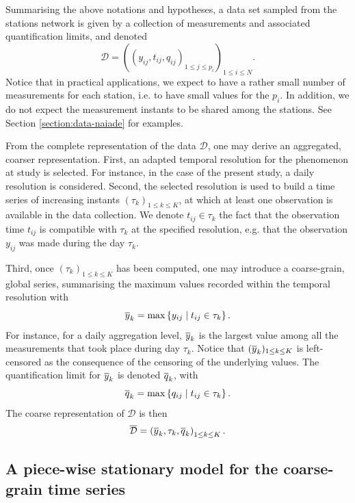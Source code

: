 Summarising the above notations and hypotheses, a data set sampled from the stations network is given by a collection of measurements and associated quantification limits, and denoted
\begin{equation*}
 \mathcal{D}=\left(\left(y_{ij},t_{ij}, q_{ij}\right)_{1\leq j\leq p_i}\right)_{1\leq i\leq N}.   
\end{equation*}
Notice that in practical applications, we expect to have a rather small number of measurements for each station, i.e. to have small values for the $p_i$. In addition, we do not expect the measurement instants to be shared among the stations. See Section \ref{section:data-naiade} for examples. 


From the complete representation of the data $\mathcal{D}$, one may derive an aggregated, coarser representation. First, an adapted temporal resolution for the phenomenon at study is selected. For instance, in the case of the present study, a daily resolution is considered. Second, the selected resolution is used to build a time series of increasing instants $(\tau_k)_{1\leq k\leq K}$, at which at least one observation is available in the data collection. We denote $t_{ij}\in\tau_k$ the fact that the observation time $t_{ij}$ is compatible with $\tau_k$ at the specified resolution, e.g. that the observation $y_{ij}$ was made during the day $\tau_k$. 

Third, once $(\tau_k)_{1\leq k\leq K}$ has been computed,  one may introduce a coarse-grain, global series, summarising the maximum values recorded within the temporal resolution with
\begin{equation}
\overline{y}_k=\max\left\{y_{ij} \mid t_{ij}\in\tau_k\right\}.
\end{equation}
For instance, for a daily aggregation level, $\overline{y}_k$ is the largest value among all the measurements that took place during day $\tau_k$. Notice that $(\overline{y}_k)_{1\leq k\leq K}$ is left-censored as the consequence of the censoring of the underlying values. The quantification limit for $\overline{y}_k$ is denoted $\overline{q}_k$, with
\begin{equation}
\overline{q}_k=\max\left\{q_{ij}\mid t_{ij}\in\tau_k\right\}.   
\end{equation}
The coarse representation of $\mathcal{D}$ is then
\begin{equation}
\overline{\mathcal{D}}=\left(\overline{y}_k, \tau_k, \overline{q}_k\right)_{1\leq k\leq K}.
\end{equation}

\subsection{A piece-wise stationary model for the coarse-grain time series}\label{subsection:pwsm}

